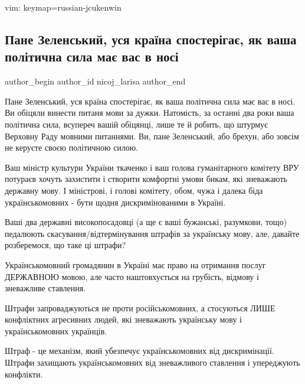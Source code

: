 vim: keymap=russian-jcukenwin
 
 
 
 
 
 
\subsection{Пане Зеленський, уся країна спостерігає, як ваша політична сила має вас в носі}
\label{sec:08_06_2021.fb.nicoj_larisa.1.zelenskii_nos_mova_ukrainizacia}
\ifcmt
 author_begin
   author_id nicoj_larisa
 author_end
\fi

Пане Зеленський, уся країна спостерігає, як ваша політична сила має вас в носі.
Ви обіцяли винести питаня мови за дужки. Натомість, за останні два роки ваша
політична сила, всупереч вашій обіцянці, лише те й робить, що штурмує Верховну
Раду мовними питаннями. Ви, пане Зеленський, або брехун, або зовсім не керуєте
своєю політичною силою.

Ваш міністр культури України ткаченко і ваш голова гуманітарного комітету ВРУ
потураєв хочуть захистити і створити комфортні умови бикам, які зневажають
державну мову. І міністрові, і голові комітету, обом, чужа і далека біда
українськомовних - бути щодня дискримінованими в Україні. 

Ваші два державні високопосадовці (а ще є ваші бужанські, разумкови, тощо)
педалюють скасування/відтермінування штрафів  за українську мову, але, давайте
розберемося, що таке ці штрафи?

Українськомовний громадянин в Україні має право на отримання послуг ДЕРЖАВНОЮ
мовою, але часто наштовхується на грубість, відмову і зневажливе ставлення. 

Штрафи запроваджуються не проти російськомовних, а  стосуються ЛИШЕ конфліктних
агресивних людей, які зневажають українську мову і українськомовних українців.

Штраф - це механізм, який убезпечує  українськомовних від дискримінації. Штрафи
захищають українськомовних від зневажливого ставлення і упереджують конфлікти.

